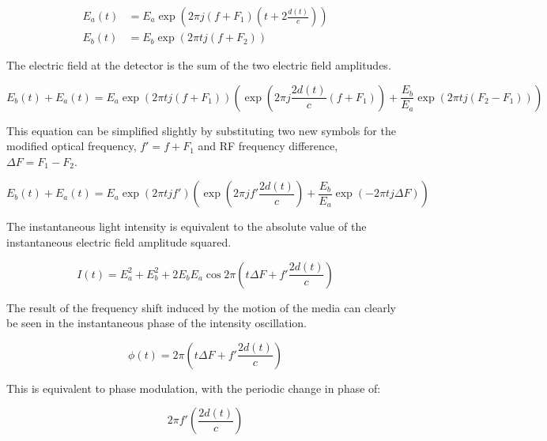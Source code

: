 \begin{align}
E_a(t) & = E_a \exp{\left(2 \pi j (f + F_1) \left( t + 2 \frac{d(t)}{c}\right) \right)}  \\
E_b(t) & = E_b \exp{(2 \pi t j (f + F_2))}
\end{align}

The electric field at the detector is the sum of the two electric field amplitudes.

\begin{dmath}
E_b(t) + E_a(t) = E_a \exp{(2 \pi t j (f + F_1))}\left(\exp{\left(2 \pi j \frac{2 d(t)}{c}(f + F_1)\right)} + \frac{E_b}{E_a} \exp{(2 \pi t j (F_2 - F_1))}\right)
\end{dmath}

This equation can be simplified slightly by substituting two new symbols for the modified optical frequency, $f' = f + F_1$ and RF frequency difference, $\Delta F = F_1 - F_2$.

\begin{dmath}
E_b(t) + E_a(t) = E_a \exp{(2 \pi t j f')}\left(\exp{\left(2 \pi j f' \frac{ 2 d(t)}{c}\right)} + \frac{E_b}{E_a} \exp{(-2 \pi t j \Delta F)}\right)
\end{dmath}

The instantaneous light intensity is equivalent to the absolute value of the instantaneous electric field amplitude squared.


\begin{dmath}
I(t) = E_a^2 + E_b^2 + 2 E_b E_a \cos{ 2 \pi \left(t \Delta F + f' \frac{2 d(t)}{c}   \right)}
\end{dmath}

The result of the frequency shift induced by the motion of the media can clearly be seen in the instantaneous phase of the intensity oscillation.

\begin{dmath}
\label{eq:phase_aom_doppler}
\phi(t) = 2 \pi \left(t \Delta F + f' \frac{2 d(t)}{c}   \right)
\end{dmath}

This is equivalent to phase modulation, with the periodic change in phase of:

\begin{equation}
2 \pi f' \left( \frac{2 d(t)}{c} \right)
\end{equation}

